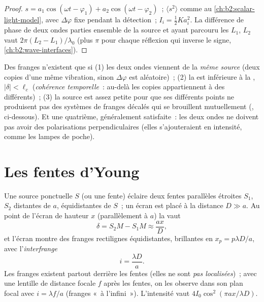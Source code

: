 \begin{proof}
$s = a_1\cos(\omega t - \varphi_1) + a_2\cos(\omega t - \varphi_2)$~; $\langle s^2\rangle$ comme au
\cref{ch:b2:scalar-light-model}, avec $\Delta\varphi$ fixe pendant la
détection~; $I_i = \tfrac12Ka_i^2$. La différence de phase de deux ondes
parties ensemble de la source et ayant parcouru les  $L_1$, $L_2$ vaut
$2\pi(L_2 - L_1)/\lambda_0$ (plus $\pi$ pour chaque réflexion qui inverse le
signe, \cref{ch:b2:wave-interfaces}).
\end{proof}

\begin{remark}\label{rem:b2:two-wave-interference:conditions}
Des franges n'existent que si (1) les deux ondes viennent de la \emph{même
source} (deux copies d'une même vibration, sinon $\Delta\varphi$ est aléatoire)~; (2)
la  est inférieure à la , $|\delta| < \ell_c$
(\emph{cohérence temporelle}~: au-delà les copies appartiennent à des  différents)~; (3) la source est assez petite pour que ses différents points
ne produisent pas des systèmes de franges décalés qui se brouillent mutuellement
(\emph{}, ci-dessous). Et une quatrième, généralement satisfaite~: les
deux ondes ne doivent pas avoir des polarisations perpendiculaires (elles s'ajouteraient
en intensité, comme les lampes de poche).
\end{remark}

\section{Les fentes d'Young}

\begin{proposition}\label{prop:b2:two-wave-interference:young}
Une source ponctuelle $S$ (ou une fente) éclaire deux fentes parallèles étroites
$S_1$, $S_2$ distantes de $a$, équidistantes de $S$~; un écran est placé à
la distance $D \gg a$. Au point de l'écran de hauteur $x$ (parallèlement
à $a$) la  vaut
\[
\delta = S_2M - S_1M \approx \frac{ax}D ,
\]
et l'écran montre des franges rectilignes équidistantes, brillantes en $x_p =
p\lambda D/a$, avec l'\emph{interfrange}
\[
i = \frac{\lambda D}a .
\]
Les franges existent partout derrière les fentes (elles ne sont \emph{pas
localisées})~; avec une lentille de distance focale $f$ après les fentes, on les
observe dans son plan focal avec $i = \lambda f/a$ (franges «~à l'infini~»).
L'intensité vaut $4I_0\cos^2(\pi ax/\lambda D)$.
\end{proposition}

